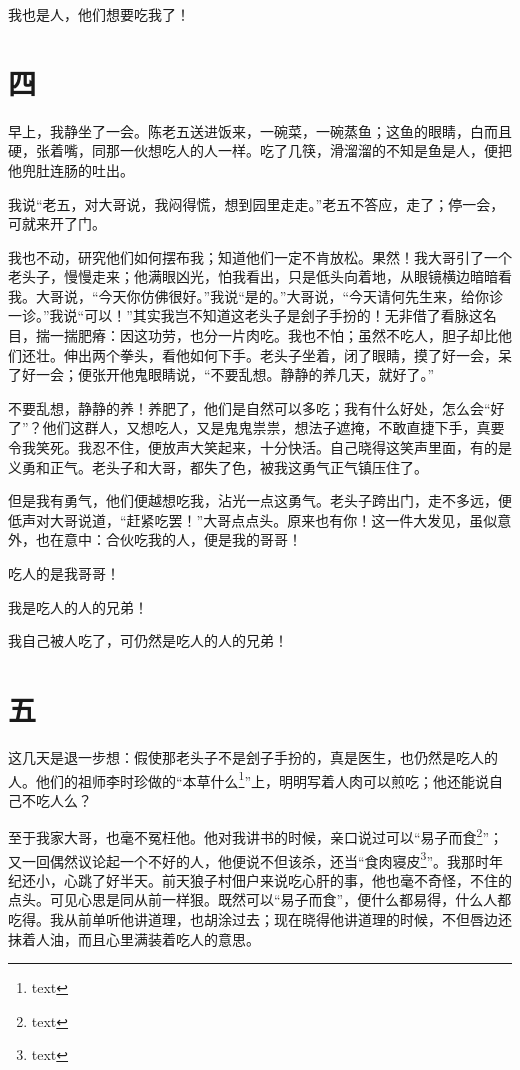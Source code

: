 \documentclass[12pt,UTF8]{ctexbook}
\begin{document}
我也是人，他们想要吃我了！

\section{四}

早上，我静坐了一会。陈老五送进饭来，一碗菜，一碗蒸鱼；这鱼的眼睛，白而且硬，张着嘴，同那一伙想吃人的人一样。吃了几筷，滑溜溜的不知是鱼是人，便把他兜肚连肠的吐出。

我说“老五，对大哥说，我闷得慌，想到园里走走。”老五不答应，走了；停一会，可就来开了门。

我也不动，研究他们如何摆布我；知道他们一定不肯放松。果然！我大哥引了一个老头子，慢慢走来；他满眼凶光，怕我看出，只是低头向着地，从眼镜横边暗暗看我。大哥说，“今天你仿佛很好。”我说“是的。”大哥说，“今天请何先生来，给你诊一诊。”我说“可以！”其实我岂不知道这老头子是刽子手扮的！无非借了看脉这名目，揣一揣肥瘠：因这功劳，也分一片肉吃。我也不怕；虽然不吃人，胆子却比他们还壮。伸出两个拳头，看他如何下手。老头子坐着，闭了眼睛，摸了好一会，呆了好一会；便张开他鬼眼睛说，“不要乱想。静静的养几天，就好了。”

不要乱想，静静的养！养肥了，他们是自然可以多吃；我有什么好处，怎么会“好了”？他们这群人，又想吃人，又是鬼鬼祟祟，想法子遮掩，不敢直捷下手，真要令我笑死。我忍不住，便放声大笑起来，十分快活。自己晓得这笑声里面，有的是义勇和正气。老头子和大哥，都失了色，被我这勇气正气镇压住了。

但是我有勇气，他们便越想吃我，沾光一点这勇气。老头子跨出门，走不多远，便低声对大哥说道，“赶紧吃罢！”大哥点点头。原来也有你！这一件大发见，虽似意外，也在意中：合伙吃我的人，便是我的哥哥！

吃人的是我哥哥！

我是吃人的人的兄弟！

我自己被人吃了，可仍然是吃人的人的兄弟！

\section{五}

这几天是退一步想：假使那老头子不是刽子手扮的，真是医生，也仍然是吃人的人。他们的祖师李时珍做的“本草什么\footnote{text}”上，明明写着人肉可以煎吃；他还能说自己不吃人么？

至于我家大哥，也毫不冤枉他。他对我讲书的时候，亲口说过可以“易子而食\footnote{text}”；又一回偶然议论起一个不好的人，他便说不但该杀，还当“食肉寝皮\footnote{text}”。我那时年纪还小，心跳了好半天。前天狼子村佃户来说吃心肝的事，他也毫不奇怪，不住的点头。可见心思是同从前一样狠。既然可以“易子而食”，便什么都易得，什么人都吃得。我从前单听他讲道理，也胡涂过去；现在晓得他讲道理的时候，不但唇边还抹着人油，而且心里满装着吃人的意思。
\end{document}
